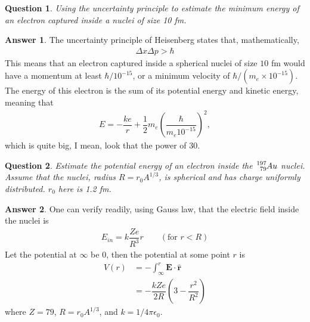 \documentclass[12pt]{paper}
\numberwithin{equation}{section}
\newtheorem{question}{Question}
\theoremstyle{definition}
\newtheorem*{answer}{Answer}
\numberwithin{equation}{section}
\begin{document}
\begin{question}
    Using the uncertainty principle to estimate the minimum energy of an electron captured inside a nuclei of size 10 fm.
\end{question}
\begin{answer}
    The uncertainty principle of Heisenberg states that, mathematically,
    \begin{align} 
        \Delta x\Delta p > \hbar
    \end{align}
    This means that an electron captured inside a spherical nuclei of size $10$ fm would have a momentum at least $\hbar/10^{-15}$, or a minimum velocity of $\hbar/(m_e\times10^{-15})$. The energy of this electron is the sum of its potential energy and kinetic energy, meaning that 
    \begin{align}
        E = -\dfrac{ke}{r} + \dfrac{1}{2}m_e\left(\dfrac{\hbar}{m_e10^{-15}}\right)^2,
    \end{align}
    which is quite big, I mean, look that the power of 30.
\end{answer}
\begin{question}
    Estimate the potential energy of an electron inside the $\ce{^197_79}Au$ nuclei. Assume that the nuclei, radius $R=r_0 A^{1/3}$, is spherical and has charge uniformly distributed. $r_0$ here is 1.2 fm.
\end{question}
\begin{answer}
    One can verify readily, using Gauss law, that the electric field inside the nuclei is 
    \begin{align} 
        E_{in} = k\dfrac{Ze}{R^3}r\qquad(\text{for } r<R)
    \end{align}
    Let the potential at $\infty$ be 0, then the potential at some point $r$ is 
    \begin{align} 
        V(r) &= -\int_{\infty}^r\mathbf{E}\cdot\hat{\mathbf{r} }\\
        &=- \dfrac{kZe}{2R}\left(3-\dfrac{r^2}{R^2}\right)
    \end{align}
    where $Z=79$, $R=r_0A^{1/3}$, and $k=1/4\pi\epsilon_0$.
\end{answer}
\newpage
\end{document}
